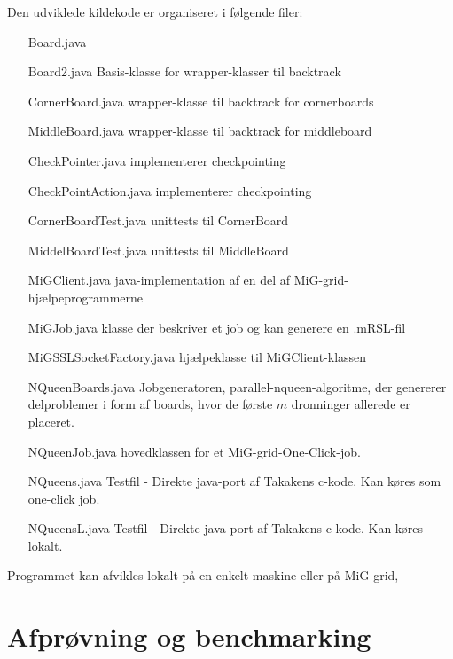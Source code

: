 \documentclass[draft,a4paper,10pt]{article}
\newcommand{\mig}{MiG}
\newcommand{\oc}{One-Click}
\begin{document}
Den udviklede kildekode er organiseret i følgende filer:
\begin{itemize}
	\item[Board.java] 
	\item[Board2.java] Basis-klasse for wrapper-klasser til backtrack
	\item[CornerBoard.java] wrapper-klasse til backtrack for cornerboards
	\item[MiddleBoard.java] wrapper-klasse til backtrack for middleboard
	\item[CheckPointer.java] implementerer checkpointing
	\item[CheckPointAction.java] implementerer checkpointing
	\item[CornerBoardTest.java] unittests til CornerBoard
	\item[MiddelBoardTest.java] unittests til MiddleBoard
	\item[MiGClient.java] java-implementation af en del af \mig-grid-hjælpeprogrammerne
	\item[MiGJob.java] klasse der beskriver et job og kan generere en .mRSL-fil
	\item[MiGSSLSocketFactory.java] hjælpeklasse til MiGClient-klassen
	\item[NQueenBoards.java] Jobgeneratoren, parallel-nqueen-algoritme, der genererer delproblemer i form af boards, hvor de første $m$ dronninger allerede er placeret. 
	\item[NQueenJob.java] hovedklassen for et \mig-grid-\oc-job. 
	\item[NQueens.java] Testfil - Direkte java-port af Takakens c-kode. Kan køres som one-click job.
	\item[NQueensL.java] Testfil - Direkte java-port af Takakens c-kode. Kan køres lokalt.
\end{itemize}

Programmet kan afvikles lokalt på en enkelt maskine eller på \mig-grid,  



\section{Afprøvning og benchmarking}
\end{document}
